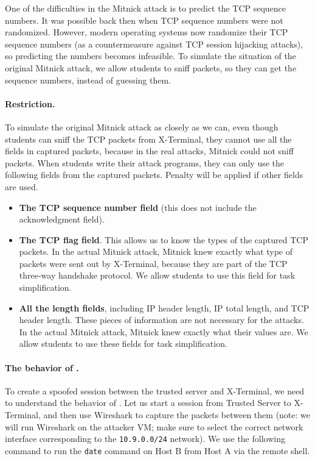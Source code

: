 One of the difficulties in the Mitnick attack is to predict the TCP sequence numbers. 
It was possible back then when TCP sequence numbers were not randomized. 
However, modern operating systems now randomize their TCP sequence numbers
(as a countermeasure against TCP session hijacking attacks), so
predicting the numbers becomes infeasible.
To simulate the situation of the original Mitnick attack, we 
allow students to sniff packets, so
they can get the sequence numbers, instead of guessing them.  

\paragraph{Restriction.} To simulate the original Mitnick attack
as closely as we can, even though students can sniff
the TCP packets from X-Terminal, they cannot use all the 
fields in captured packets, because in the real attacks,
Mitnick could not sniff packets. When students write their 
attack programs, they can only use the 
following fields from the captured packets. Penalty will be 
applied if other fields are used.

\begin{itemize}
\item \textbf{The TCP sequence number field} (this does not include the acknowledgment
field).

\item \textbf{The TCP flag field}. This allows us to know the types of the 
captured TCP packets. In the actual Mitnick attack, Mitnick knew
exactly what type of packets were sent out by X-Terminal, because 
they are part of the TCP three-way handshake protocol. 
We allow students to use this field for task simplification. 


\item \textbf{All the length fields}, including IP header length, IP total length,
and TCP header length. These pieces of information are not necessary 
for the attacks. In the actual Mitnick attack, Mitnick knew exactly what their
values are. We allow students to use these fields for task simplification. 
\end{itemize}


\paragraph{The behavior of \rsh.} 
To create a spoofed \rsh session between the trusted server and X-Terminal,
we need to understand the behavior of \rsh. Let us start a 
\rsh session from Trusted Server to X-Terminal, and then use Wireshark
to capture the packets between them (note: we will run Wireshark
on the attacker VM; make sure to select the correct network
interface corresponding to the \texttt{10.9.0.0/24} network). 
We use the following command to
run the \texttt{date} command on Host B from Host A via the \rsh  
remote shell.


